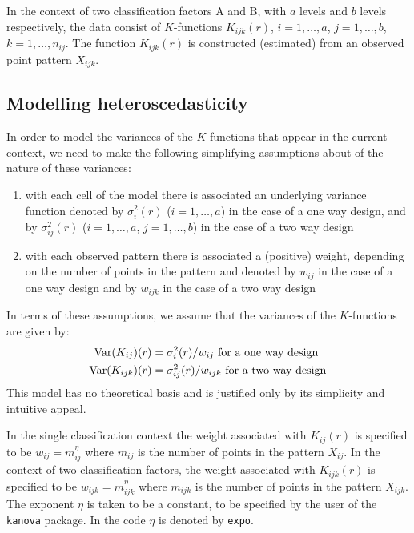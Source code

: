 \documentclass[12pt]{article}
\newcommand{\Var}{\mbox{$\textup{\textrm{Var}}$}}
\begin{document}
In the context of two classification factors A and B, with
$a$ levels and $b$ levels respectively, the data consist of
$K$-functions $K_{ijk}(r)$, $i = 1, \ldots, a$, $j = 1, \ldots, b$,
$k = 1, \ldots, n_{ij}$.  The function $K_{ijk}(r)$ is constructed
(estimated) from an observed point pattern $X_{ijk}$.

\subsection{Modelling heteroscedasticity}
\label{sec:heteroMod}

In order to model the variances of the $K$-functions that appear
in the current context, we need to make the following simplifying
assumptions about of the nature of these variances:
\begin{enumerate}
\item with each cell of the model there is associated an underlying
variance function denoted by $\sigma_i^2(r)$ ($i = 1, \ldots, a$)
in the case of a one way design, and by $\sigma_{ij}^2(r)$ ($i =
1, \ldots, a$, $j = 1, \ldots, b$) in the case of a two way design

\item with each observed pattern there is associated a (positive)
weight, depending on the number of points in the pattern and denoted
by $w_{ij}$ in the case of a one way design and by $w_{ijk}$ in
the case of a two way design
\end{enumerate}

In terms of these assumptions, we assume that the variances of the
$K$-functions are given by:
\begin{align*}
\Var(K_{ij})(r) &= \sigma_i^2(r)/w_{ij} \mbox{~for a one way design}\\
\Var(K_{ijk})(r) &= \sigma_{ij}^2(r)/w_{ijk} \mbox{~for a two way design}
\end{align*}
This model has no theoretical basis and is justified only
by its simplicity and intuitive appeal.

In the single classification context the weight associated
with $K_{ij}(r)$ is specified to be $w_{ij} = m_{ij}^{\eta}$
where $m_{ij}$ is the number of points in the pattern $X_{ij}$.
In the context of two classification factors, the weight associated
with $K_{ijk}(r)$ is specified to be $w_{ijk} = m_{ijk}^{\eta}$
where $m_{ijk}$ is the number of points in the pattern $X_{ijk}$.
The exponent $\eta$ is taken to be a constant, to be specified
by the user of the \texttt{kanova} package.  In the code $\eta$
is denoted by \texttt{expo}.
\end{document}
